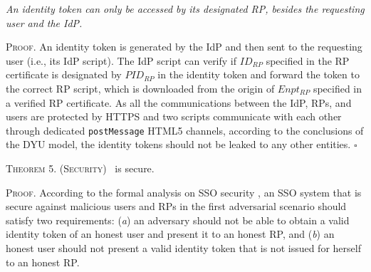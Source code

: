 \vspace{3mm}
 {\em An identity token can only be accessed by its designated RP, besides the requesting user and the IdP.}

\vspace{0.75mm}
\noindent\textsc{Proof.}
An identity token is generated by the IdP and then sent to the requesting user (i.e., its IdP script). The IdP script can verify if $ID_{RP}$ specified in the RP certificate is designated by $PID_{RP}$ in the identity token and forward the token to the correct RP script, which is downloaded from the origin of $Enpt_{RP}$ specified in a verified RP certificate. %
As all the communications between the IdP, RPs, and users are protected by HTTPS and two scripts communicate with each other through dedicated \verb+postMessage+ HTML5 channels, according to the conclusions of the DYU model, the identity tokens should not be leaked to any other entities. \hfill $\square$


\vspace{3mm}
\noindent\textsc{Theorem 5. (Security)} {\usso~is secure.}

\vspace{0.75mm}
\noindent\textsc{Proof.}
According to the formal analysis on SSO security \cite{SPRESSO, FettKS14}, an SSO system that is secure against malicious users and RPs in the first adversarial scenario should satisfy two requirements: (\emph{a}) an adversary should not be able to obtain a valid identity token of an honest user and present it to an honest RP, and (\emph{b}) an honest user should not present a valid identity token that is not issued for herself to an honest RP.


